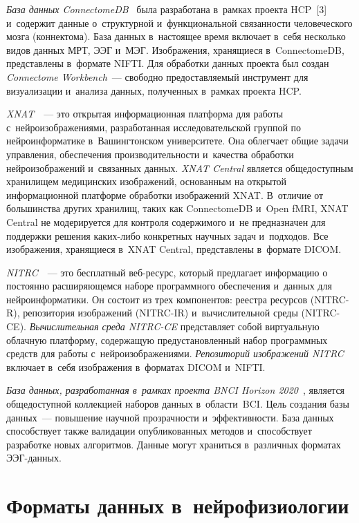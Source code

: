 \begin{multicols}{2}
    \textit{База данных ConnectomeDB}~\cite{10-bs} была разработана 
в~рамках проекта HCP~[3] и~содержит данные 
о~структурной и~функциональной связанности человеческого мозга 
(коннектома). База данных в~настоящее время включает в~себя несколько 
видов данных МРТ, ЭЭГ и~МЭГ. Изображения, хранящиеся в~ConnectomeDB, 
представлены в~формате NIFTI. Для обработки данных проекта был создан 
\textit{Connectome Workbench}~--- свободно предоставляемый инструмент 
для визуализации и~анализа данных, полученных в~рамках проекта HCP.
    
    \textit{XNAT}~\cite{11-bs}~--- это открытая информационная платформа 
для работы с~нейроизображениями, разработанная исследовательской 
группой по нейроинформатике в~Вашингтонском университете. Она 
облегчает общие задачи управления, обеспечения производительности 
и~качества обработки нейроизображений и~связанных данных. \textit{XNAT 
Central} является общедоступным хранилищем медицинских изображений, 
основанным на открытой информационной платформе обработки 
изображений XNAT. В~отличие от большинства других хранилищ, таких как 
ConnectomeDB и~Open fMRI, XNAT Central не модерируется для контроля 
содержимого и~не предназначен для поддержки решения ка\-ких-ли\-бо 
конкретных научных задач и~подходов. Все изображения, хранящиеся 
в~XNAT Central, представлены в~формате DICOM.
    
    \textit{NITRC}~\cite{12-bs}~--- это бесплатный веб-ре\-сурс, который 
предлагает информацию о постоянно расширяющемся наборе программного 
обеспечения и~данных для нейроинформатики. Он состоит из трех 
компонентов: реестра ресурсов (NITRC-R), репозитория изображений 
(NITRC-IR) и~вычислительной среды (NITRC-CE). \textit{Вычислительная 
среда NITRC-CE} представляет собой виртуальную облачную платформу, 
содержащую предустановленный набор программных средств для работы 
с~нейроизображениями. \textit{Репозиторий изображений NITRC} включает 
в~себя изображения в~форматах DICOM и~NIFTI.
    
    \textit{База данных, разработанная в~рамках проекта BNCI Horizon 
2020}~\cite{4-bs}, является общедоступной коллекцией наборов данных 
в~области~BCI. Цель создания базы данных~--- 
повышение научной про\-зрач\-ности и~эф\-фек\-тив\-ности. База данных 
способствует также валидации опубликованных методов и~способствует 
разработке новых алгоритмов. Данные могут храниться в~различных 
форматах ЭЭГ-дан\-ных.
    
\section{Форматы данных в~нейрофизиологии}


\end{multicols}
